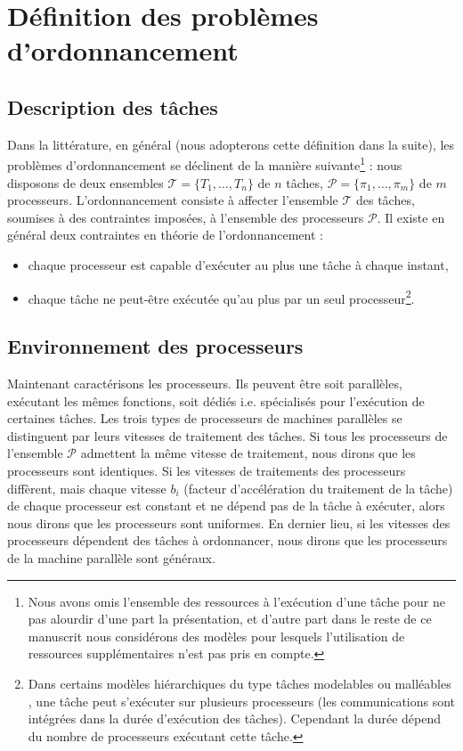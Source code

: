 \documentclass[a4paper,11pt]{article}
\begin{document}
\section{Définition des problèmes d'ordonnancement}

\subsection{Description des tâches}

Dans la littérature, en général (nous adopterons cette définition dans la suite), les problèmes
d'ordonnancement se déclinent de la manière suivante\footnote{Nous avons omis l'ensemble des
    ressources à l'exécution d'une tâche pour ne pas alourdir d'une part la présentation, et d'autre
    part dans le reste de ce manuscrit nous considérons des modèles pour lesquels l'utilisation de
ressources supplémentaires n'est pas pris en compte.} : nous disposons de deux ensembles
$\mathcal{T}=\{T_1,\ldots,T_n\}$ de $n$ tâches, $\mathcal{P}=\{\pi_1,\ldots,\pi_m\}$ de $m$
processeurs. L'ordonnancement consiste à affecter l'ensemble $\mathcal{T}$ des tâches, soumises à
des contraintes imposées, à l'ensemble des processeurs $\mathcal{P}$. Il existe en général deux
contraintes en théorie de l'ordonnancement :

\begin{itemize}
    \item chaque processeur est capable d'exécuter au plus une tâche à chaque instant,
    \item chaque tâche ne peut-être exécutée qu'au plus par un seul processeur\footnote{Dans
        certains modèles hiérarchiques du type tâches modelables ou malléables \cite{blayo,decker},
    une tâche peut s'exécuter sur plusieurs processeurs (les communications sont intégrées dans la
durée d'exécution des tâches). Cependant  la durée dépend du nombre de processeurs exécutant cette
tâche.}.%
\end{itemize}

\subsection{Environnement des processeurs}

Maintenant caractérisons les processeurs. Ils peuvent être soit parallèles, exécutant les mêmes
fonctions, soit dédiés i.e. spécialisés pour l'exécution de certaines tâches. Les trois types de
processeurs de machines parallèles se distinguent par leurs vitesses de traitement des tâches. Si
tous les processeurs de l'ensemble $\mathcal{P}$ admettent la même vitesse de traitement, nous
dirons que les processeurs sont identiques. Si les vitesses de traitements des processeurs
diffèrent, mais chaque vitesse $b_i$ (facteur d'accélération du traitement de la tâche) de chaque
processeur est constant et ne dépend pas de la tâche à exécuter, alors nous dirons que les
processeurs sont uniformes. En dernier lieu, si les vitesses des processeurs dépendent des tâches à
ordonnancer, nous dirons que les processeurs de la machine parallèle sont généraux.
\end{document}
